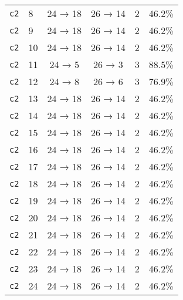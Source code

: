\begin{tabular}{llcccc}
\texttt{c2} & 8 & 24 → 18 & 26 → 14 & 2 & 46.2\% \\
\texttt{c2} & 9 & 24 → 18 & 26 → 14 & 2 & 46.2\% \\
\texttt{c2} & 10 & 24 → 18 & 26 → 14 & 2 & 46.2\% \\
\texttt{c2} & 11 & 24 → 5 & 26 → 3 & 3 & 88.5\% \\
\texttt{c2} & 12 & 24 → 8 & 26 → 6 & 3 & 76.9\% \\
\texttt{c2} & 13 & 24 → 18 & 26 → 14 & 2 & 46.2\% \\
\texttt{c2} & 14 & 24 → 18 & 26 → 14 & 2 & 46.2\% \\
\texttt{c2} & 15 & 24 → 18 & 26 → 14 & 2 & 46.2\% \\
\texttt{c2} & 16 & 24 → 18 & 26 → 14 & 2 & 46.2\% \\
\texttt{c2} & 17 & 24 → 18 & 26 → 14 & 2 & 46.2\% \\
\texttt{c2} & 18 & 24 → 18 & 26 → 14 & 2 & 46.2\% \\
\texttt{c2} & 19 & 24 → 18 & 26 → 14 & 2 & 46.2\% \\
\texttt{c2} & 20 & 24 → 18 & 26 → 14 & 2 & 46.2\% \\
\texttt{c2} & 21 & 24 → 18 & 26 → 14 & 2 & 46.2\% \\
\texttt{c2} & 22 & 24 → 18 & 26 → 14 & 2 & 46.2\% \\
\texttt{c2} & 23 & 24 → 18 & 26 → 14 & 2 & 46.2\% \\
\texttt{c2} & 24 & 24 → 18 & 26 → 14 & 2 & 46.2\% \\
\bottomrule
\end{tabular}
